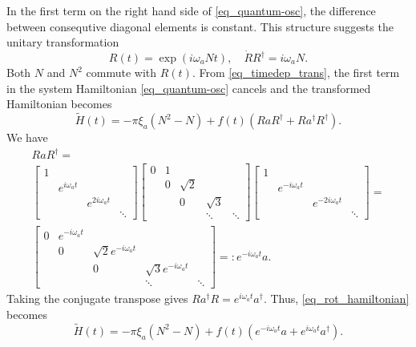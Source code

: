 \documentclass[11pt]{article}
\begin{document}
In the first term on the right hand side of \eqref{eq_quantum-osc}, the difference between
consequtive diagonal elements is constant. This structure suggests the unitary
transformation
\[
R(t) = \exp(i\omega_a N t),\quad \dot{R}R^\dag = i\omega_a N.
\]
Both $N$ and $N^2$ commute with $R(t)$. From \eqref{eq_timedep_trans}, the first term in the system
Hamiltonian \eqref{eq_quantum-osc} cancels and the transformed Hamiltonian becomes
\begin{equation}\label{eq_rot_hamiltonian}
  \widetilde{H}(t) = -\pi\xi_a \left(N^2 - N\right) +
%
  f(t) \left( R a R^\dag + R a^\dag R^\dag \right).
\end{equation}
We have
\begin{multline*}
  R a R^\dag =\\
\begin{bmatrix}
  1 & & & \\
  & e^{i\omega_a t} & & \\
  & &  e^{2i\omega_a t} & \\
  & & & \ddots
\end{bmatrix}
\begin{bmatrix}
0 & 1 & & &\\
 & 0 & \sqrt{2} & &\\
&  & 0 & \sqrt{3} &\\
& &  & \ddots & \ddots
\end{bmatrix}
\begin{bmatrix}
  1 & & & \\
  & e^{-i\omega_a t} & & \\
  & &  e^{-2i\omega_a t} & \\
  & & & \ddots
\end{bmatrix} = \\
%
\begin{bmatrix}
0 & e^{-i\omega_a t} & & &\\
 & 0 & \sqrt{2} e^{-i\omega_a t}& &\\
&  & 0 & \sqrt{3} e^{-i\omega_a t}  &\\
& &  & \ddots & \ddots
\end{bmatrix} =: e^{-i\omega_a t} a.
%
\end{multline*}
Taking the conjugate transpose gives $R a^\dag R = e^{i\omega_a t} a^\dag$. Thus,
\eqref{eq_rot_hamiltonian} becomes
\begin{equation}\label{eq_trans-hamiltonian}
\widetilde{H}(t) = -\pi\xi_a \left(N^2 - N\right) +
  f(t) \left( e^{-i\omega_a t} a + e^{i\omega_a t} a^\dag \right).
\end{equation}
\end{document}
